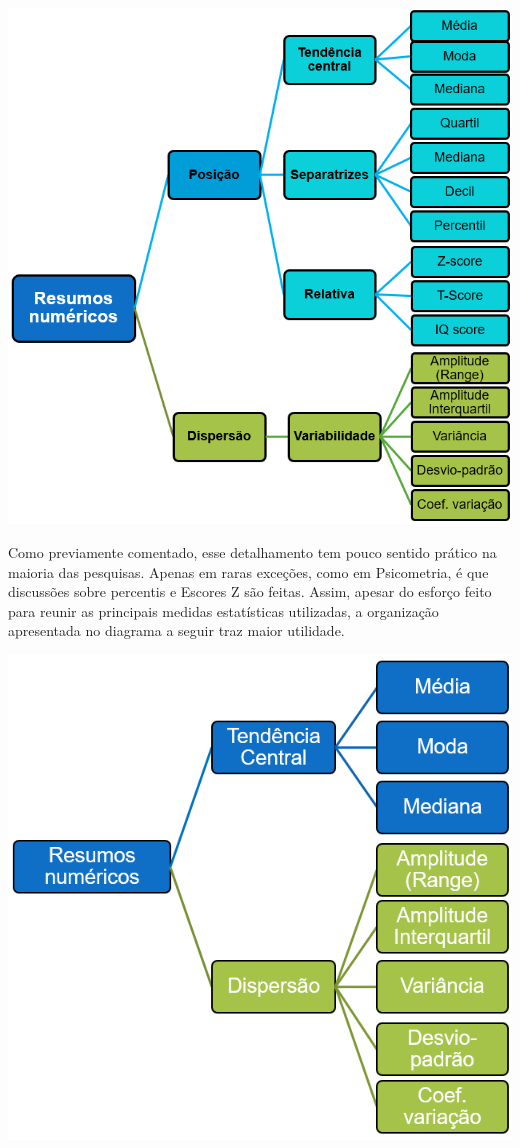 \documentclass[
]{book}
\begin{document}
\includegraphics{./img/cap_desc_medidas_posicao_dispersao.png}

Como previamente comentado, esse detalhamento tem pouco sentido prático
na maioria das pesquisas. Apenas em raras exceções, como em Psicometria,
é que discussões sobre percentis e Escores Z são feitas. Assim, apesar
do esforço feito para reunir as principais medidas estatísticas
utilizadas, a organização apresentada no diagrama a seguir traz maior
utilidade.

\includegraphics{./img/cap_desc_medidas_posicao_dispersao2.png}
\end{document}
